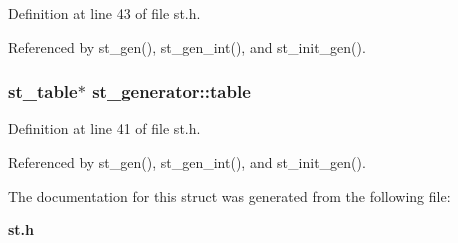 Definition at line 43 of file st.h.

Referenced by st\_\-gen(), st\_\-gen\_\-int(), and st\_\-init\_\-gen().
\subsubsection{\setlength{\rightskip}{0pt plus 5cm}\bf{st\_\-table}$\ast$ \bf{st\_\-generator::table}}\label{structst__generator_e75565c5656c86f95323740684912519}




Definition at line 41 of file st.h.

Referenced by st\_\-gen(), st\_\-gen\_\-int(), and st\_\-init\_\-gen().

The documentation for this struct was generated from the following file:\begin{CompactItemize}
\item 
\bf{st.h}\end{CompactItemize}

